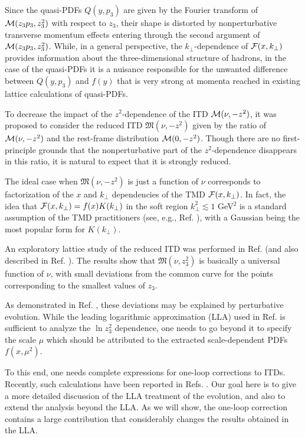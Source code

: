 \documentclass[aps,prd,twocolumn,showpacs,preprintnumbers,superscriptaddress]{revtex4-1}
\begin{document}
 
 Since the quasi-PDFs $Q(y,p_3)$ are given by
 the Fourier transform of ${\cal M} (z_3 p_3, z_3^2)$
 with respect to $z_3$, their shape  is distorted by nonperturbative  
 transverse momentum effects  entering through the second argument of 
  ${\cal M} (z_3 p_3, z_3^2)$.  
 While,   in a general perspective, the 
 \mbox{$k_\perp$-dependence}  of  ${\cal F} (x, k_\perp)$
provides information about the three-dimensional structure 
of hadrons, in the case of the quasi-PDFs it 
is a nuisance responsible for the unwanted  difference between
$Q(y,p_3)$ and $f(y)$ that is very strong at momenta reached in 
existing lattice calculations of quasi-PDFs. 

To decrease the impact of the $z^2$-dependence of the 
ITD ${\cal M} (\nu, -z^2)$, it was proposed  \cite{Radyushkin:2017cyf}
to consider the reduced ITD ${\mathfrak M} (\nu, -z^2)$
given by the ratio of  ${\cal M} (\nu, -z^2)$ and the rest-frame 
distribution  ${\cal M} (0, -z^2)$. 
Though  there are no first-principle grounds
that the nonperturbative part of the \mbox{$z^2$-dependence}  disappears in this ratio,
it is natural to expect that it is strongly reduced.

The ideal case when ${\mathfrak M} (\nu, -z^2)$ is  just a function 
of $\nu$  corresponds to factorization
of the $x$ and $k_\perp$ dependencies of the TMD 
${\cal F} (x, k_\perp)$.  In fact, the idea that ${\cal F} (x, k_\perp) = f(x) K(k_\perp)$
in the soft region $k_\perp^2 \lesssim 1$ GeV$^2$  is 
a standard assumption of the TMD practitioners  (see, e.g., Ref. \cite{Anselmino:2013lza}), 
with a Gaussian being the most popular form for 
$K(k_\perp)$.  

An exploratory lattice study of the reduced ITD 
was  performed in Ref. \cite{Orginos:2017kos} (and also described in Ref.
\cite{Karpie:2017bzm}).  The results show that
${\mathfrak M} (\nu, z_3^2)$ is basically a universal 
function of $\nu$, with small deviations from the common curve 
for the points corresponding to the smallest values of $z_3$. 

As demonstrated in Ref. \cite{Orginos:2017kos}, these 
deviations may be explained by  perturbative evolution. 
While  the leading logarithmic approximation (LLA) 
used in Ref.  \cite{Orginos:2017kos}  is  sufficient to analyze the
$\ln z_3^2$ dependence, 
one needs to go   beyond it to
 specify the scale $\mu$  which should be attributed 
to the extracted scale-dependent PDFs $f(x,\mu^2)$. 



To this end,  one needs complete expressions for one-loop corrections to ITDs.
Recently,  such  calculations have been reported  in Refs. 
 \cite{Ji:2017rah,Radyushkin:2017lvu}.   
Our goal here is to give a more detailed discussion 
of the LLA  treatment of the evolution,  
and also to extend the  analysis 
beyond the LLA.  
As we will  show,  the one-loop correction contains a large
 contribution  that  considerably changes the results 
 obtained in the LLA. 
\end{document}
